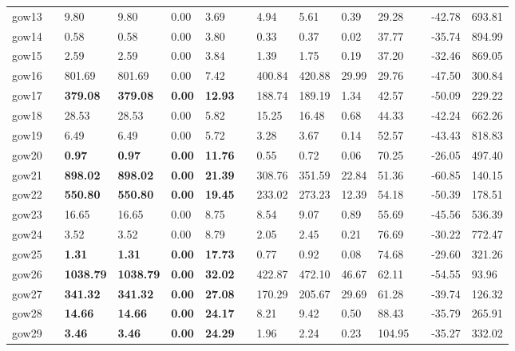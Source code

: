 \begin{table}[H]
\begin{tabularx}{\textwidth}{llXXXXlXXXXlXX}
    gow13 && 9.80 & 9.80 & 0.00 & 3.69 && 4.94 & 5.61 & 0.39 & 29.28 && -42.78 & 693.81\\
    gow14 && 0.58 & 0.58 & 0.00 & 3.80 && 0.33 & 0.37 & 0.02 & 37.77 && -35.74 & 894.99\\
    gow15 && 2.59 & 2.59 & 0.00 & 3.84 && 1.39 & 1.75 & 0.19 & 37.20 && -32.46 & 869.05\\
    gow16 && 801.69 & 801.69 & 0.00 & 7.42 && 400.84 & 420.88 & 29.99 & 29.76 && -47.50 & 300.84\\
    gow17 && \textbf{379.08} & \textbf{379.08} & \textbf{0.00} & \textbf{12.93} && 188.74 & 189.19 & 1.34 & 42.57 && -50.09 & 229.22\\
    gow18 && 28.53 & 28.53 & 0.00 & 5.82 && 15.25 & 16.48 & 0.68 & 44.33 && -42.24 & 662.26\\
    gow19 && 6.49 & 6.49 & 0.00 & 5.72 && 3.28 & 3.67 & 0.14 & 52.57 && -43.43 & 818.83\\
    gow20 && \textbf{0.97} & \textbf{0.97} & \textbf{0.00} & \textbf{11.76} && 0.55 & 0.72 & 0.06 & 70.25 && -26.05 & 497.40\\
    gow21 && \textbf{898.02} & \textbf{898.02} & \textbf{0.00} & \textbf{21.39} && 308.76 & 351.59 & 22.84 & 51.36 && -60.85 & 140.15\\
    gow22 && \textbf{550.80} & \textbf{550.80} & \textbf{0.00} & \textbf{19.45} && 233.02 & 273.23 & 12.39 & 54.18 && -50.39 & 178.51\\
    gow23 && 16.65 & 16.65 & 0.00 & 8.75 && 8.54 & 9.07 & 0.89 & 55.69 && -45.56 & 536.39\\
    gow24 && 3.52 & 3.52 & 0.00 & 8.79 && 2.05 & 2.45 & 0.21 & 76.69 && -30.22 & 772.47\\
    gow25 && \textbf{1.31} & \textbf{1.31} & \textbf{0.00} & \textbf{17.73} && 0.77 & 0.92 & 0.08 & 74.68 && -29.60 & 321.26\\
    gow26 && \textbf{1038.79} & \textbf{1038.79} & \textbf{0.00} & \textbf{32.02} && 422.87 & 472.10 & 46.67 & 62.11 && -54.55 & 93.96\\
    gow27 && \textbf{341.32} & \textbf{341.32} & \textbf{0.00} & \textbf{27.08} && 170.29 & 205.67 & 29.69 & 61.28 && -39.74 & 126.32\\
    gow28 && \textbf{14.66} & \textbf{14.66} & \textbf{0.00} & \textbf{24.17} && 8.21 & 9.42 & 0.50 & 88.43 && -35.79 & 265.91\\
    gow29 && \textbf{3.46} & \textbf{3.46} & \textbf{0.00} & \textbf{24.29} && 1.96 & 2.24 & 0.23 & 104.95 && -35.27 & 332.02\\

\end{tabularx}
\end{table}
